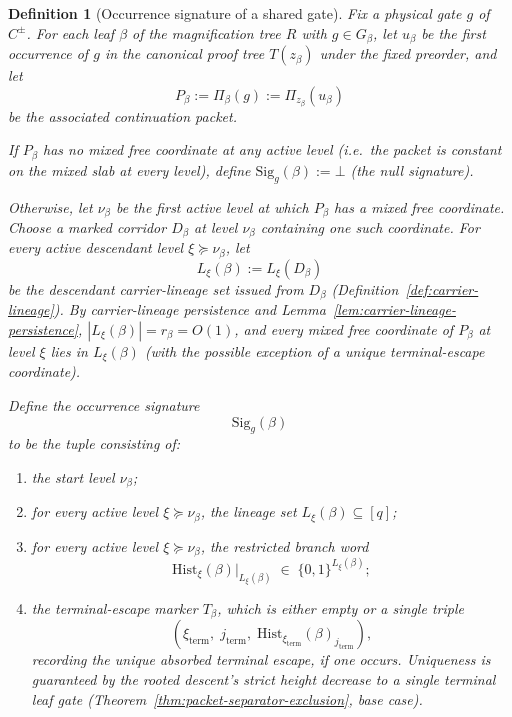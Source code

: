 \documentclass[11pt]{article}
\newtheorem{definition}[theorem]{Definition}
\begin{document}
\begin{definition}[Occurrence signature of a shared gate]
\label{def:occurrence-signature}
Fix a physical gate $g$ of $C^{\pm}$.  For each leaf $\beta$ of the
magnification tree $R$ with $g \in G_\beta$, let $u_\beta$ be the first
occurrence of $g$ in the canonical proof tree $T(z_\beta)$ under the
fixed preorder, and let
\[
P_\beta := \Pi_\beta(g) := \Pi_{z_\beta}(u_\beta)
\]
be the associated continuation packet.

If $P_\beta$ has no mixed free coordinate at any active level (i.e.\ the
packet is constant on the mixed slab at every level), define
$\mathrm{Sig}_g(\beta) := \bot$ (the \emph{null signature}).

Otherwise, let $\nu_\beta$ be the first active level at which $P_\beta$
has a mixed free coordinate.  Choose a marked corridor $D_\beta$ at level
$\nu_\beta$ containing one such coordinate.  For every active descendant
level $\xi \succeq \nu_\beta$, let
\[
L_\xi(\beta) := L_\xi(D_\beta)
\]
be the descendant carrier-lineage set issued from $D_\beta$
(Definition~\ref{def:carrier-lineage}).  By carrier-lineage persistence
and Lemma~\ref{lem:carrier-lineage-persistence},
$|L_\xi(\beta)| = r_\beta = O(1)$, and every mixed free coordinate of
$P_\beta$ at level $\xi$ lies in $L_\xi(\beta)$ (with the possible
exception of a unique terminal-escape coordinate).

Define the \emph{occurrence signature}
\[
\mathrm{Sig}_g(\beta)
\]
to be the tuple consisting of:
\begin{enumerate}
\item the start level $\nu_\beta$;
\item for every active level $\xi \succeq \nu_\beta$, the lineage set
  $L_\xi(\beta) \subseteq [q]$;
\item for every active level $\xi \succeq \nu_\beta$, the restricted
  branch word
  \[
  \mathrm{Hist}_\xi(\beta)\big|_{L_\xi(\beta)}
  \;\in\; \{0,1\}^{L_\xi(\beta)};
  \]
\item the terminal-escape marker $T_\beta$, which is either empty or a
  single triple
  \[
  (\xi_{\mathrm{term}},\; j_{\mathrm{term}},\;
   \mathrm{Hist}_{\xi_{\mathrm{term}}}(\beta)_{j_{\mathrm{term}}}),
  \]
  recording the unique absorbed terminal escape, if one occurs.
  Uniqueness is guaranteed by the rooted descent's strict height
  decrease to a single terminal leaf gate
  (Theorem~\ref{thm:packet-separator-exclusion}, base case).
\end{enumerate}
\end{definition}
\end{document}

